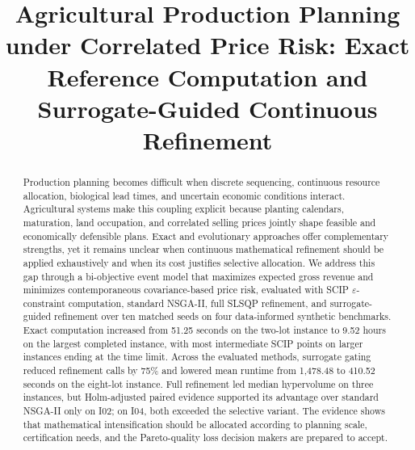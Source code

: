\documentclass[]{interact}
\begin{document}

\title{Agricultural Production Planning under Correlated Price Risk: Exact Reference Computation and Surrogate-Guided Continuous Refinement}

\author{
}

\maketitle

\begin{abstract}
Production planning becomes difficult when discrete sequencing, continuous resource allocation, biological lead times, and uncertain economic conditions interact. Agricultural systems make this coupling explicit because planting calendars, maturation, land occupation, and correlated selling prices jointly shape feasible and economically defensible plans. Exact and evolutionary approaches offer complementary strengths, yet it remains unclear when continuous mathematical refinement should be applied exhaustively and when its cost justifies selective allocation. We address this gap through a bi-objective event model that maximizes expected gross revenue and minimizes contemporaneous covariance-based price risk, evaluated with SCIP $\varepsilon$-constraint computation, standard NSGA-II, full SLSQP refinement, and surrogate-guided refinement over ten matched seeds on four data-informed synthetic benchmarks. Exact computation increased from 51.25 seconds on the two-lot instance to 9.52 hours on the largest completed instance, with most intermediate SCIP points on larger instances ending at the time limit. Across the evaluated methods, surrogate gating reduced refinement calls by 75\% and lowered mean runtime from 1,478.48 to 410.52 seconds on the eight-lot instance. Full refinement led median hypervolume on three instances, but Holm-adjusted paired evidence supported its advantage over standard NSGA-II only on I02; on I04, both exceeded the selective variant. The evidence shows that mathematical intensification should be allocated according to planning scale, certification needs, and the Pareto-quality loss decision makers are prepared to accept.
\end{abstract}
\end{document}
